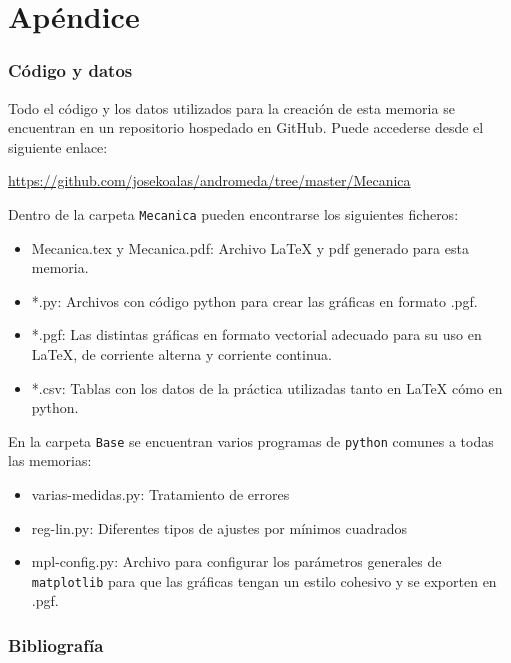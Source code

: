 \documentclass[12pt, a4paper, titlepage]{article}
\newcommand{\code}[1]{\texttt{#1}} %
\begin{document}
  \newpage
  \part*{Apéndice}

  \section*{Código y datos}

  Todo el código y los datos utilizados para la creación de esta memoria se encuentran en un repositorio hospedado en GitHub. Puede accederse desde el siguiente enlace:

  \url{https://github.com/josekoalas/andromeda/tree/master/Mecanica}

  Dentro de la carpeta \code{Mecanica} pueden encontrarse los siguientes ficheros:

  \begin{itemize}[label=$-$]
    \item Mecanica.tex y Mecanica.pdf: Archivo LaTeX y pdf generado para esta memoria.
    \item *.py: Archivos con código python para crear las gráficas en formato .pgf.
    \item *.pgf: Las distintas gráficas en formato vectorial adecuado para su uso en LaTeX, de corriente alterna y corriente continua.
    \item *.csv: Tablas con los datos de la práctica utilizadas tanto en LaTeX cómo en python.
  \end{itemize}

  En la carpeta \code{Base} se encuentran varios programas de \code{python} comunes a todas las memorias:

  \begin{itemize}[label=$-$]
    \item varias-medidas.py: Tratamiento de errores
    \item reg-lin.py: Diferentes tipos de ajustes por mínimos cuadrados
    \item mpl-config.py: Archivo para configurar los parámetros generales de \code{matplotlib} para que las gráficas tengan un estilo cohesivo y se exporten en .pgf.
  \end{itemize}

  \section*{Bibliografía}
\end{document}
